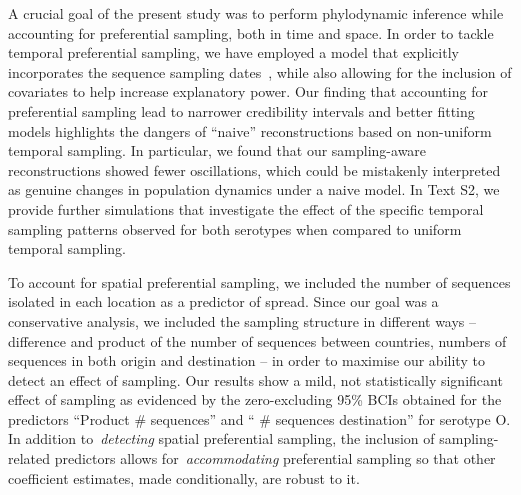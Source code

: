 \documentclass[10pt]{article}
\begin{document}

A crucial goal of the present study was to perform phylodynamic inference while accounting for preferential sampling, both in time and space.
In order to tackle temporal preferential sampling, we have employed a model that explicitly incorporates the sequence sampling dates~\citep{Karcher2020}, while also allowing for the inclusion of covariates to help increase explanatory power.
Our finding that accounting for preferential sampling lead to narrower credibility intervals and better fitting models highlights the dangers of ``naive'' reconstructions based on non-uniform temporal sampling.
In particular, we found that our sampling-aware reconstructions showed fewer oscillations, which could be mistakenly interpreted as genuine changes in population dynamics under a naive model. 
In Text S2, we provide further simulations that investigate the effect of the specific temporal sampling patterns observed for both serotypes when compared to uniform temporal sampling.

To account for spatial preferential sampling, we included the number of sequences isolated in each location as a predictor of spread. 
Since our goal was a conservative analysis, we included the sampling structure in different ways -- difference and product of the number of sequences between countries, numbers of sequences in both origin and destination -- in order to maximise our ability to detect an effect of sampling.
Our results show a mild, not statistically significant effect of sampling as evidenced by the zero-excluding 95\% BCIs obtained for the predictors ``Product \# sequences'' and `` \# sequences destination'' for serotype O.
In addition to~\textit{detecting} spatial preferential sampling, the inclusion of sampling-related predictors allows for~\textit{accommodating} preferential sampling so that other coefficient estimates, made conditionally, are robust to it.
\end{document}
